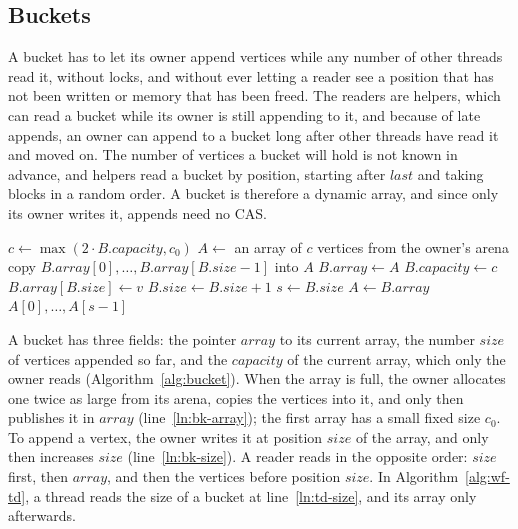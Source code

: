 \subsection{Buckets}
\label{sec:td-buckets}

A bucket has to let its owner append vertices while any number of other threads read it, without locks, and without ever letting a reader see a position that has not been written or memory that has been freed. The readers are helpers, which can read a bucket while its owner is still appending to it, and because of late appends, an owner can append to a bucket long after other threads have read it and moved on. The number of vertices a bucket will hold is not known in advance, and helpers read a bucket by position, starting after $\mathit{last}$ and taking blocks in a random order. A bucket is therefore a dynamic array, and since only its owner writes it, appends need no CAS.

\begin{algorithm}
\caption{Appending to a bucket $B$, which only its owner does, and reading it, which any thread can do.}
\label{alg:bucket}
\begin{algorithmic}[1]
        \State $c \gets \max(2 \cdot B.\mathit{capacity}, c_0)$
        \State $A \gets$ an array of $c$ vertices from the owner's arena
        \State copy $B.\mathit{array}[0], \ldots, B.\mathit{array}[B.\mathit{size}-1]$ into $A$
        \State $B.\mathit{array} \gets A$ \label{ln:bk-array}
        \State $B.\mathit{capacity} \gets c$
    \EndIf
    \State $B.\mathit{array}[B.\mathit{size}] \gets v$
    \State $B.\mathit{size} \gets B.\mathit{size} + 1$ \label{ln:bk-size}
\EndProcedure
\Statex
{}
    \State $s \gets B.\mathit{size}$
    \State $A \gets B.\mathit{array}$
    \State \Return $A[0], \ldots, A[s-1]$
\EndProcedure
\end{algorithmic}
\end{algorithm}

A bucket has three fields: the pointer $\mathit{array}$ to its current array, the number $\mathit{size}$ of vertices appended so far, and the $\mathit{capacity}$ of the current array, which only the owner reads (Algorithm~\ref{alg:bucket}). When the array is full, the owner allocates one twice as large from its arena, copies the vertices into it, and only then publishes it in $\mathit{array}$ (line~\ref{ln:bk-array}); the first array has a small fixed size $c_0$. To append a vertex, the owner writes it at position $\mathit{size}$ of the array, and only then increases $\mathit{size}$ (line~\ref{ln:bk-size}). A reader reads in the opposite order: $\mathit{size}$ first, then $\mathit{array}$, and then the vertices before position $\mathit{size}$. In Algorithm~\ref{alg:wf-td}, a thread reads the size of a bucket at line~\ref{ln:td-size}, and its array only afterwards.


